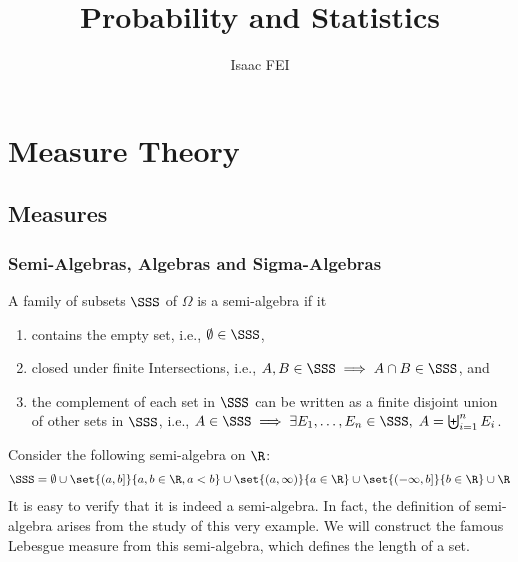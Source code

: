 \documentclass[thmcnt=section, 12pt]{elegantbook}
\title{Probability and Statistics}
\author{Isaac FEI}
\begin{document}
\maketitle

\frontmatter
\tableofcontents
\mainmatter



\part{Measure Theory}





\chapter{Measures}


\section{Semi-Algebras, Algebras and Sigma-Algebras}


\begin{definition}
    A family of subsets $\SSS$ of $\Omega$ is a semi-algebra if it
    \begin{enumerate}
        \item contains the empty set, i.e., $\emptyset \in \SSS $, 
        \item closed under finite Intersections, i.e., $A, B \in \SSS \implies A \cap B \in \SSS$, and 
        \item the complement of each set in $\SSS$ can be written as a finite disjoint union of other sets in $\SSS$, i.e., $A \in \SSS \implies \exists E_1, \ldots, E_n \in  \SSS, \; A = \biguplus_{i=1}^n E_i$.
    \end{enumerate}
\end{definition}

\begin{example} \label{eg:1}
    Consider the following semi-algebra on $\R$:
    \begin{align*}
        \SSS = \emptyset 
        \cup \set{(a, b]}{a, b \in \R, a < b}
        \cup \set{(a, \infty)}{a \in \R}
        \cup \set{(-\infty, b]}{b \in \R}
        \cup \R
    \end{align*}
    It is easy to verify that it is indeed a semi-algebra. In fact, the definition of semi-algebra arises from the study of this very example. We will construct the famous Lebesgue measure from this semi-algebra, which defines the length of a set.
\end{example}
\end{document}
